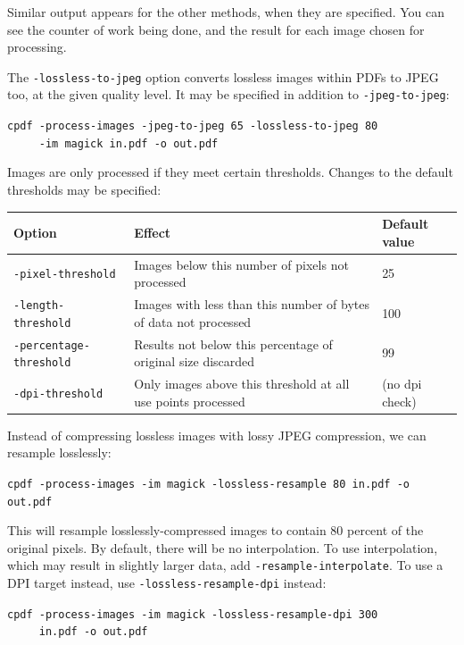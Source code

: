 \documentclass{book}
\begin{document}
\noindent Similar output appears for the other methods, when they are specified. You can see the counter of work being done, and the result for each image chosen for processing.

The \texttt{-lossless-to-jpeg} option converts lossless images within PDFs to JPEG too, at the given quality level. It may be specified in addition to \texttt{-jpeg-to-jpeg}:

  \begin{framed}
  \noindent\small\verb!cpdf -process-images -jpeg-to-jpeg 65 -lossless-to-jpeg 80!\\
  \noindent\small\verb!     -im magick in.pdf -o out.pdf!
  \end{framed}

\noindent Images are only processed if they meet certain thresholds. Changes to the default thresholds may be specified:

\bigskip
\begin{tabular}{lp{6cm}l}
Option & Effect & Default value\\\hline
{\small\texttt{-pixel-threshold}} & Images below this number of pixels not processed & 25 \\
{\small\texttt{-length-threshold}} & Images with less than this number of bytes of data not processed & 100 \\
{\small\texttt{-percentage-threshold}} & Results not below this percentage of original size discarded & 99 \\
{\small\texttt{-dpi-threshold}} & Only images above this threshold at all use points processed & (no dpi check)
\end{tabular}
\bigskip

\noindent Instead of compressing lossless images with lossy JPEG compression, we can resample losslessly:

  \begin{framed}
  \noindent\small\verb!cpdf -process-images -im magick -lossless-resample 80 in.pdf -o out.pdf!
  \end{framed}

\noindent This will resample losslessly-compressed images to contain 80 percent of the original pixels. By default, there will be no interpolation. To use interpolation, which may result in slightly larger data, add \texttt{-resample-interpolate}. To use a DPI target instead, use \texttt{-lossless-resample-dpi} instead:

  \begin{framed}
  \noindent\small\verb!cpdf -process-images -im magick -lossless-resample-dpi 300!\\
  \noindent\small\verb!     in.pdf -o out.pdf!
  \end{framed}
\end{document}
